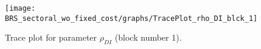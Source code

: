 \begin{figure}[H]
\centering
  \texttt{[image: BRS\_sectoral\_wo\_fixed\_cost/graphs/TracePlot\_rho\_DI\_blck\_1]}\\
    \caption{Trace plot for parameter ${\rho_{DI}}$ (block number 1).}
\end{figure}
